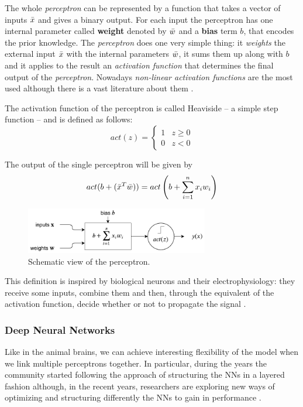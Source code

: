The whole \textit{perceptron} can be represented by a function that takes a vector of inputs $\Bar{x}$ and gives a binary output.
For each input the perceptron has one internal parameter called \textbf{weight} denoted by $\Bar{w}$ and a \textbf{bias} term $b$, that encodes the prior knowledge.
The \textit{perceptron} does one very simple thing: it \textit{weights} the external input $\Bar{x}$ with the internal parameters $\Bar{w}$, it sums them up along with $b$ and it applies to the result an \textit{activation function} that determines the final output of the \textit{perceptron}.
Nowadays \textit{non-linear activation functions} are the most used although there is a vast literature about them \cite{nwankpa2018activation}.

The activation function of the perceptron is called Heaviside -- a simple step function -- and is defined as follows:
\[ act(z) = \begin{cases} 
      1 & z \geq 0 \\
      0 & z < 0 
   \end{cases}
\]

The output of the single perceptron will be given by
$$
act(b+ (\Bar{x}^T \Bar{w})) = act \left(b+ \sum_{i=1}^{n} x_i w_i \right)
$$

\begin{figure}[H]
	\centering
	\includegraphics[width=8cm, keepaspectratio]{img/2_2_perceptron.png}
	\caption{Schematic view of the perceptron.}
\end{figure}

This definition is inspired by biological neurons and their electrophysiology: they receive some inputs, combine them and then, through the equivalent of the activation function, decide whether or not to propagate the signal \cite{Rosenblatt58theperceptron}.

\subsubsection{Deep Neural Networks}
Like in the animal brains, we can achieve interesting flexibility of the model when we link multiple perceptrons together.
In particular, during the years the community started following the approach of structuring the NNs in a layered fashion \cite{layered_nets} although, in the recent years, researchers are exploring new ways of optimizing and structuring differently the NNs to gain in performance \cite{lottery_ticket} \cite{weight_agnostic}.

